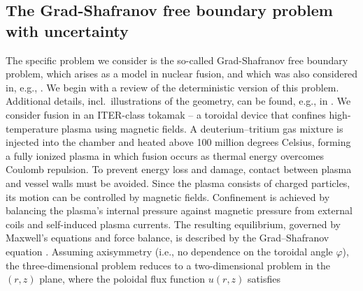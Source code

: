 \subsection{The Grad-Shafranov free boundary problem with uncertainty}\label{sec:Grad-Shafranov}
The specific problem we consider is the so-called Grad-Shafranov free boundary problem, which arises as a model in nuclear fusion, and which was also considered
in, e.g., \cite{HCElman_JLiang_TSanchez-Vizuet_2022a}.
We begin with a review of the deterministic version of this problem. Additional details, incl.\ illustrations of the geometry, can be found, e.g., in \cite{HCElman_JLiang_TSanchez-Vizuet_2022a}.
We consider fusion in an ITER-class tokamak -- a toroidal device that confines high-temperature plasma using magnetic fields. 
A deuterium–tritium gas mixture is injected into the chamber and heated above 100 million degrees Celsius, forming a fully ionized plasma in which fusion occurs as thermal energy overcomes Coulomb repulsion. To prevent energy loss and damage, contact between plasma and vessel walls must be avoided. Since the plasma consists of charged particles, its motion can be controlled by magnetic fields. Confinement is achieved by balancing the plasma’s internal pressure against magnetic pressure from external coils and self-induced plasma currents. The resulting equilibrium, governed by Maxwell’s equations and force balance, is described by the Grad–Shafranov equation \cite{GrRu:1958, LuSc:1957, Shafranov:1958}. Assuming axisymmetry (i.e., no dependence on the toroidal angle $\varphi$), the three-dimensional problem reduces to a two-dimensional problem in the $(r, z)$ plane, where the poloidal flux function $u(r,z)$ satisfies
%
